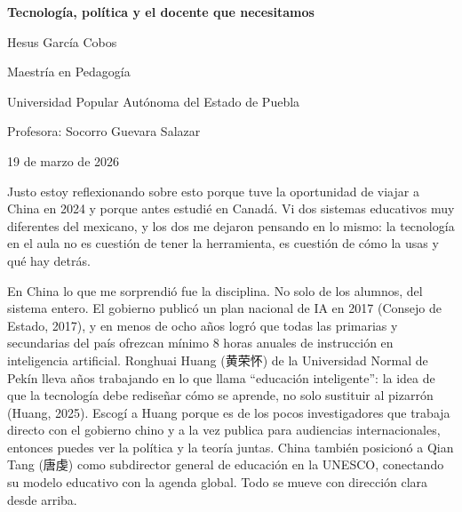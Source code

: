 \documentclass[12pt,a4paper]{article}
\newcommand{\zh}[1]{{\cjkfont #1}}
\begin{document}
\begin{titlepage}
\centering
\vspace*{3cm}

{\LARGE\bfseries Tecnología, política y el docente que necesitamos\par}

\vspace{2cm}

{\large Hesus García Cobos\par}

\vspace{1cm}

{\large Maestría en Pedagogía\par}
{\large Universidad Popular Autónoma del Estado de Puebla\par}

\vspace{1cm}

{\large Profesora: Socorro Guevara Salazar\par}

\vspace{1cm}

{\large 19 de marzo de 2026\par}

\vfill
\end{titlepage}


Justo estoy reflexionando sobre esto porque tuve la oportunidad de viajar a China en 2024 y porque antes estudié en Canadá. Vi dos sistemas educativos muy diferentes del mexicano, y los dos me dejaron pensando en lo mismo: la tecnología en el aula no es cuestión de tener la herramienta, es cuestión de cómo la usas y qué hay detrás.

En China lo que me sorprendió fue la disciplina. No solo de los alumnos, del sistema entero. El gobierno publicó un plan nacional de IA en 2017 (Consejo de Estado, 2017), y en menos de ocho años logró que todas las primarias y secundarias del país ofrezcan mínimo 8 horas anuales de instrucción en inteligencia artificial. Ronghuai Huang (\zh{黄荣怀}) de la Universidad Normal de Pekín lleva años trabajando en lo que llama ``educación inteligente'': la idea de que la tecnología debe rediseñar cómo se aprende, no solo sustituir al pizarrón (Huang, 2025). Escogí a Huang porque es de los pocos investigadores que trabaja directo con el gobierno chino y a la vez publica para audiencias internacionales, entonces puedes ver la política y la teoría juntas. China también posicionó a Qian Tang (\zh{唐虔}) como subdirector general de educación en la UNESCO, conectando su modelo educativo con la agenda global. Todo se mueve con dirección clara desde arriba.
\end{document}

